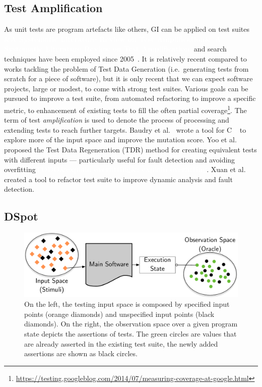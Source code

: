 \documentclass[11pt]{sdm_internship}
\newcommand{\CS}{C\nolinebreak\hspace{-.05em}\raisebox{.6ex}{\scriptsize\bf \#}}
\newcommand{\addref}[1]{\colorbox{TealBlue!100}{\textcolor{white}{\textbf{$[$\ifx&#1&\ \else#1\fi$]$}}}}
\newcommand{\todo}[1]{\colorbox{Red!75}{\textcolor{white}{\textbf{TODO\ifx&#1&\else: #1\fi}}}}
\newcommand{\rephrase}[1]{\colorbox{BlueViolet!60}{\textcolor{white}{\textbf{$\sim$#1}}}}
\newcommand{\dspot}{DSpot\xspace}
\theoremstyle{definition}
\begin{document}
\subsection{Test Amplification}%
\label{ssec:test_amplification}
As unit tests are program artefacts like others, GI can be applied on test suites~\cite{danglot2017emerging}\addref{A Systematic Literature Review on Test Amplification} and search techniques have been employed since 2005~\cite{baudry2005automatic}.
It is relatively recent compared to works tackling the problem of Test Data Generation (i.e.\ generating tests from scratch for a piece of software), but it is only recent that we can expect software projects, large or modest, to come with strong test suites.
Various goals can be pursued to improve a test suite, from automated refactoring to improve a specific metric, to enhancement of existing tests to fill the often partial coverage\footnote{\url{https://testing.googleblog.com/2014/07/measuring-coverage-at-google.html}}.
The term of test \emph{amplification} is used to denote the process of processing and extending tests to reach further targets.
Baudry et al.~\cite{baudry2005automatic} wrote a tool for \CS{}\rephrase{} to explore more of the input space and improve the mutation score.
Yoo et al.~\cite{yoo2012test} proposed the Test Data Regeneration (TDR) method for creating equivalent tests with different inputs --- particularly useful for fault detection and avoiding overfitting\todo{explain overfitting}.
Xuan et al.~\cite{xuan2015dynamic,xuan2016b} created a tool to refactor test suite to improve dynamic analysis and fault detection.

\subsection{\dspot{}}%
\label{ssec:dspot}

\begin{figure}
  \centering
  \includegraphics[width=36em]{spaces_report}
  \caption{On the left, the testing input space is composed by specified input points (orange diamonds) and unspecified input points (black diamonds). On the right, the observation space over a given program state depicts the assertions of tests. The green circles are values that are already asserted in the existing test suite, the newly added assertions are shown as black circles.}%
\label{fig:spaces}
\end{figure}
\end{document}
